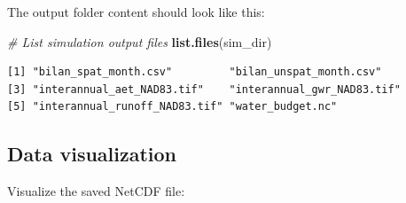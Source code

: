\documentclass[
]{book}
\newenvironment{Shaded}{\begin{snugshade}}{\end{snugshade}}
\newcommand{\CommentTok}[1]{\textcolor[rgb]{0.56,0.35,0.01}{\textit{#1}}}
\newcommand{\FunctionTok}[1]{\textcolor[rgb]{0.13,0.29,0.53}{\textbf{#1}}}
\newcommand{\NormalTok}[1]{#1}
\begin{document}
The output folder content should look like this:

\begin{Shaded}
\begin{Highlighting}[]
\CommentTok{\# List simulation output files}
\FunctionTok{list.files}\NormalTok{(sim\_dir)}
\end{Highlighting}
\end{Shaded}

\begin{verbatim}
[1] "bilan_spat_month.csv"         "bilan_unspat_month.csv"      
[3] "interannual_aet_NAD83.tif"    "interannual_gwr_NAD83.tif"   
[5] "interannual_runoff_NAD83.tif" "water_budget.nc"             
\end{verbatim}

\hypertarget{data-visualization}{%
\subsection{Data visualization}\label{data-visualization}}

Visualize the saved NetCDF file:
\end{document}
